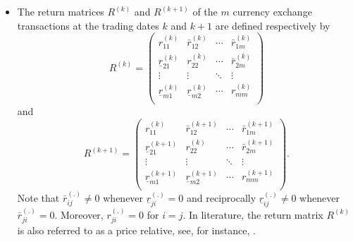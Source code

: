 \documentclass[11pt]{article}
\numberwithin{equation}{section}
\begin{document}
\begin{itemize}
	\item The return matrices $R^{(k)}$ and $R^{(k+1)}$ of the $m$ currency exchange transactions at the  trading dates $k$ and $k+1$ are defined respectively by 
	\begin{equation}\label{RK}
	R^{(k)}=  \left(\begin{array}{ccccc}
	r_{11}^{(k)} & \bar r_{12}^{(k)}&\cdots&\bar r_{1m}^{(k)}\\
	\underline r_{21}^{(k)} & r_{22}^{(k)}&\cdots&\bar r_{2m}^{(k)}\\
	\vdots & \vdots &\ddots&\vdots\\
	\underline r_{m1}^{(k)} &\underline r_{m2}^{(k)}&\cdots&r_{mm}^{(k)}\\
	\end{array}
	\right) 
	\end{equation}
	and 
	\begin{equation}\label{RK+1}
	R^{(k+1)}= \left(\begin{array}{ccccc} 
	r_{11}^{(k)} & \bar r_{12}^{(k+1)}&\cdots&\bar r_{1m}^{(k+1)}\\
	\underline r_{21}^{(k+1)} & r_{22}^{(k)}&\cdots&\bar r_{2m}^{(k+1)}\\
	\vdots & \vdots &\ddots&\vdots\\
	\underline r_{m1}^{(k+1)} &\underline r_{m2}^{(k+1)}&\cdots&r_{mm}^{(k+1)}\\
	\end{array}
	\right).
	\end{equation}
Note that $\bar r_{ij}^{(.)} \neq0$ whenever $\underline r_{ji}^{(.)} =0$ and reciprocally $\underline r_{ij}^{(.)} \neq0$ whenever $\bar r_{ji}^{(.)} =0$.  Moreover, 
	 $r_{ji}^{(.)}=0$ for $i=j$.  In literature, the return matrix $R^{(k)}$ is also referred to as a price relative, see, for instance,    \cite{ALZ2001}.
	

\end{itemize}
\end{document}
